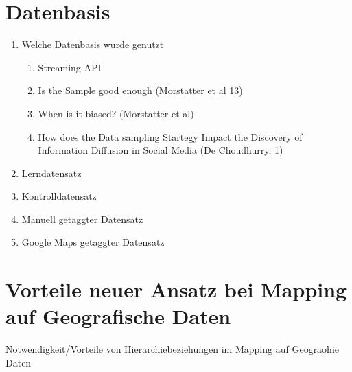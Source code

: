 	\section{Datenbasis}
		\begin{enumerate}
			\item Welche Datenbasis wurde genutzt 
				\begin{enumerate}
					\item Streaming API
					\item Is the Sample good enough (Morstatter et al 13)
					\item When is it biased? (Morstatter et al)
					\item How does the Data sampling Startegy Impact the Discovery of Information Diffusion in Social Media (De Choudhurry, 1)
				\end{enumerate}
			\item Lerndatensatz
			\item Kontrolldatensatz
			\item Manuell getaggter Datensatz
			\item Google Maps getaggter Datensatz
		\end{enumerate}			
	 
	 \section{Vorteile neuer Ansatz bei Mapping auf Geografische Daten}	
	Notwendigkeit/Vorteile von Hierarchiebeziehungen im Mapping auf Geograohie Daten
